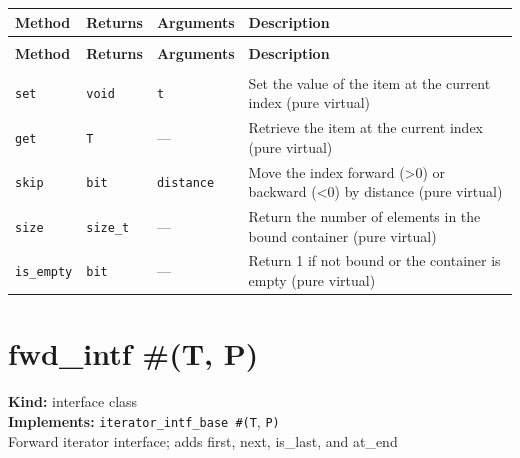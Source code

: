 \documentclass[11pt,letterpaper]{report}
\begin{document}
\begin{xltabular}{\linewidth}{>{\small}p{1.35in} >{\small}p{1.25in} >{\small}p{0.95in} >{\small}X}
\toprule
\textbf{Method} & \textbf{Returns} & \textbf{Arguments} & \textbf{Description} \\
\midrule
\endfirsthead
{} \\
\midrule
\textbf{Method} & \textbf{Returns} & \textbf{Arguments} & \textbf{Description} \\
\midrule
\endhead
\midrule
{} \\
\endfoot
\bottomrule
\endlastfoot
\texttt{set} & \texttt{void} & \texttt{t} & Set the value of the item at the current index (pure virtual) \\
\texttt{get} & \texttt{T} & --- & Retrieve the item at the current index (pure virtual) \\
\texttt{skip} & \texttt{bit} & \texttt{distance} & Move the index forward (\textgreater{}0) or backward (\textless{}0) by distance (pure virtual) \\
\texttt{size} & \texttt{size\_t} & --- & Return the number of elements in the bound container (pure virtual) \\
\texttt{is\_empty} & \texttt{bit} & --- & Return 1 if not bound or the container is empty (pure virtual) \\
\end{xltabular}

\section{fwd\_intf \#(T, P)}
\label{cls:fwdintfTP}

\noindent\textbf{Kind:} interface class\\
\noindent\textbf{Implements:} \texttt{iterator\_intf\_base \#(T}, \texttt{P)}\\
\noindent Forward iterator interface; adds first, next, is\_last, and at\_end
\end{document}
